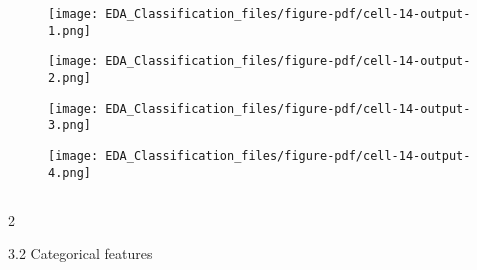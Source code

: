 \documentclass[
  letterpaper,
  DIV=11,
  numbers=noendperiod]{scrartcl}
\begin{document}
\begin{figure}[H]

{\centering \texttt{[image: EDA\_Classification\_files/figure-pdf/cell-14-output-1.png]}

}

\end{figure}

\begin{figure}[H]

{\centering \texttt{[image: EDA\_Classification\_files/figure-pdf/cell-14-output-2.png]}

}

\end{figure}

\begin{figure}[H]

{\centering \texttt{[image: EDA\_Classification\_files/figure-pdf/cell-14-output-3.png]}

}

\end{figure}

\begin{figure}[H]

{\centering \texttt{[image: EDA\_Classification\_files/figure-pdf/cell-14-output-4.png]}

}

\end{figure}

\hypertarget{section-6}{%
\subsection{}\label{section-6}}

2

3.2 Categorical features
\end{document}
